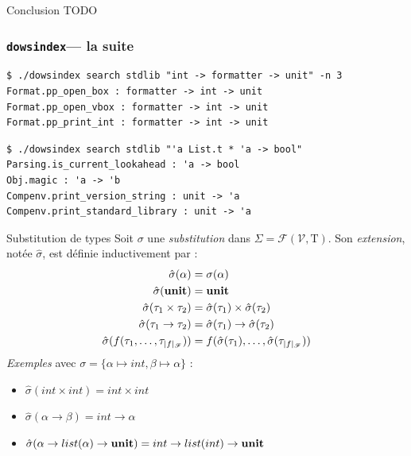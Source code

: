 \documentclass[serif]{beamer}
\newcommand{\dowsindex}{\texttt{dowsindex}\xspace}
\newcommand{\exemples}{\textit{Exemples}\xspace}
\newcommand{\unit}{\bold{unit}}
\newcommand{\V}{\mathscr{V}}
\newcommand{\F}{\mathscr{F}}
\newcommand{\T}{\mathrm{T}}
\begin{document}

\begin{frame}{Conclusion}
TODO
\end{frame}


\begin{frame}[fragile=singleslide]\frametitle{\dowsindex — la suite}
\small
\begin{verbatim}
$ ./dowsindex search stdlib "int -> formatter -> unit" -n 3
Format.pp_open_box : formatter -> int -> unit
Format.pp_open_vbox : formatter -> int -> unit
Format.pp_print_int : formatter -> int -> unit
\end{verbatim}
\begin{verbatim}
$ ./dowsindex search stdlib "'a List.t * 'a -> bool"
Parsing.is_current_lookahead : 'a -> bool
Obj.magic : 'a -> 'b
Compenv.print_version_string : unit -> 'a
Compenv.print_standard_library : unit -> 'a
\end{verbatim}
\end{frame}


\appendix


\begin{frame}{Substitution de types}
\small
Soit $\sigma$ une \emph{substitution} dans $\Sigma = \mathscr{F} (\V, \T)$. Son \emph{extension}, notée $\hat\sigma$, est définie inductivement par :
\begin{align*}
		\hat\sigma (\alpha) &=
		\sigma (\alpha)
	\\
		\hat\sigma (\unit) &=
		\unit
	\\
		\hat\sigma (\tau_1 \times \tau_2) &=
		\hat\sigma (\tau_1) \times \hat\sigma (\tau_2)
	\\
		\hat\sigma (\tau_1 \rightarrow \tau_2) &=
		\hat\sigma (\tau_1) \rightarrow \hat\sigma (\tau_2)
	\\
		\hat\sigma (f (\tau_1, \dots, \tau_{|f|_\F})) &=
		f (\hat\sigma (\tau_1), \dots, \hat\sigma (\tau_{|f|_\F}))
\end{align*}
\exemples avec $\sigma = \{ \alpha \mapsto int, \beta \mapsto \alpha \}$ :
\begin{itemize}
	\item $\hat\sigma (int \times int) = int \times int$
	\item $\hat\sigma (\alpha \rightarrow \beta) = int \rightarrow \alpha$
	\item $\hat\sigma (\alpha \rightarrow list (\alpha) \rightarrow \unit) = int \rightarrow list (int) \rightarrow \unit$
\end{itemize}
\end{frame}
\end{document}
